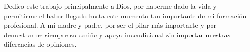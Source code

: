 
Dedico este trabajo principalmente a Dios, por haberme dado la vida y permitirme el haber llegado hasta este momento tan importante de mi formación profesional. A mi madre y padre, por ser el pilar más importante y por demostrarme siempre su cariño y apoyo incondicional sin importar nuestras diferencias de opiniones. 